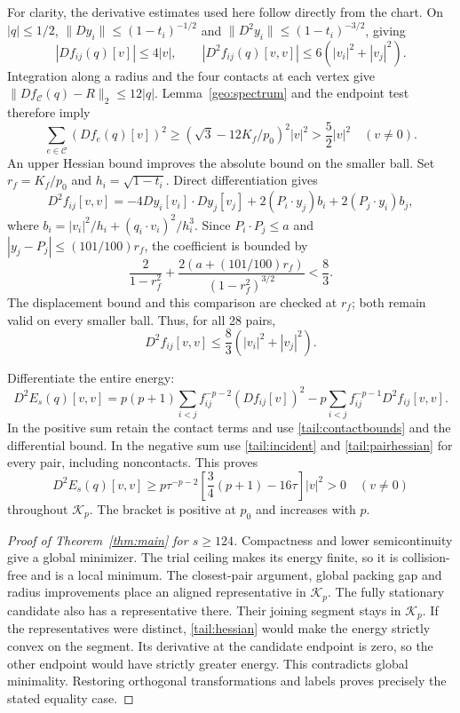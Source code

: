\documentclass[12pt,reqno]{amsart}
\theoremstyle{definition}
\numberwithin{equation}{section}
\begin{document}
For clarity, the derivative estimates used here follow directly from
the chart. On $|q|\le1/2$, $\|Dy_i\|\le(1-t_i)^{-1/2}$ and
$\|D^2y_i\|\le(1-t_i)^{-3/2}$, giving
\[
 |Df_{ij}(q)[v]|\le4|v|,\qquad
 |D^2f_{ij}(q)[v,v]|\le6(|v_i|^2+|v_j|^2).
\]
Integration along a radius and the four contacts at each vertex give
$\|Df_{\mathcal C}(q)-R\|_2\le12|q|$.
Lemma~\ref{geo:spectrum} and the endpoint test therefore imply
\[
 \sum_{e\in\mathcal C}(Df_e(q)[v])^2
 \ge(\sqrt3-12K_f/p_0)^2|v|^2>\frac52|v|^2\quad(v\ne0).
\]
An upper Hessian bound improves the absolute bound on the smaller ball.
Set $r_f=K_f/p_0$ and $h_i=\sqrt{1-t_i}$. Direct differentiation gives
\[
 D^2f_{ij}[v,v]=-4Dy_i[v_i]\cdot Dy_j[v_j]
 +2(P_i\cdot y_j)b_i+2(P_j\cdot y_i)b_j,
\]
where $b_i=|v_i|^2/h_i+(q_i\cdot v_i)^2/h_i^3$.
Since $P_i\cdot P_j\le a$ and
$|y_j-P_j|\le(101/100)r_f$, the coefficient is bounded by
\[
 \frac2{1-r_f^2}+\frac{2(a+(101/100)r_f)}{(1-r_f^2)^{3/2}}<\frac83.
\]
The displacement bound and this comparison are checked at $r_f$;
both remain valid on every smaller ball. Thus, for all 28 pairs,
\begin{equation}\label{tail:pairhessian}
 D^2f_{ij}[v,v]\le\frac83(|v_i|^2+|v_j|^2).
\end{equation}

Differentiate the entire energy:
\[
 D^2E_s(q)[v,v]=p(p+1)\sum_{i<j}f_{ij}^{-p-2}(Df_{ij}[v])^2
                 -p\sum_{i<j}f_{ij}^{-p-1}D^2f_{ij}[v,v].
\]
In the positive sum retain the contact terms and use
\eqref{tail:contactbounds} and the differential bound. In the negative
sum use \eqref{tail:incident} and \eqref{tail:pairhessian} for every
pair, including noncontacts. This proves
\begin{equation}\label{tail:hessian}
 D^2E_s(q)[v,v]\ge p\tau^{-p-2}
       \left[\frac34(p+1)-16\tau\right]|v|^2>0\quad(v\ne0)
\end{equation}
throughout $\mathcal K_p$. The bracket is positive at $p_0$ and
increases with $p$.

\begin{proof}[Proof of Theorem~\ref{thm:main} for $s\ge124$]
Compactness and lower semicontinuity give a global minimizer.
The trial ceiling makes its energy finite, so it is collision-free
and is a local minimum. The closest-pair argument, global packing gap
and radius improvements place an aligned representative in
$\mathcal K_p$. The fully stationary candidate
also has a representative there.
Their joining segment stays in $\mathcal K_p$. If the representatives
were distinct, \eqref{tail:hessian} would make the energy strictly
convex on the segment. Its derivative at the candidate endpoint is
zero, so the other endpoint would have strictly greater energy.
This contradicts global minimality. Restoring orthogonal transformations
and labels proves precisely the stated equality case.
\end{proof}
\end{document}

